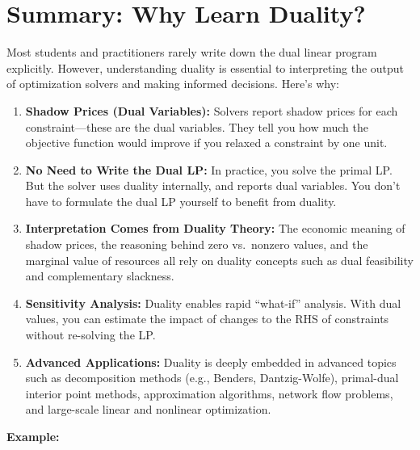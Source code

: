 \section{Summary: Why Learn Duality?}

\begin{tcolorbox}[colback=gray!5!white, colframe=black!75!white, title=\textbf{Duality in Practice: Why It Matters}]
Most students and practitioners rarely write down the dual linear program explicitly. 
However, understanding duality is essential to interpreting the output of optimization solvers 
and making informed decisions. Here's why:

\begin{enumerate}
    \item \textbf{Shadow Prices (Dual Variables):}  
    Solvers report shadow prices for each constraint—these are the dual variables. 
    They tell you how much the objective function would improve if you relaxed a constraint by one unit.
    
    \item \textbf{No Need to Write the Dual LP:}  
    In practice, you solve the primal LP. But the solver uses duality internally, and reports dual variables.
    You don't have to formulate the dual LP yourself to benefit from duality.
    
    \item \textbf{Interpretation Comes from Duality Theory:}  
    The economic meaning of shadow prices, the reasoning behind zero vs.\ nonzero values, and the marginal value of resources 
    all rely on duality concepts such as dual feasibility and complementary slackness.
    
    \item \textbf{Sensitivity Analysis:}  
    Duality enables rapid “what-if” analysis. With dual values, you can estimate the impact of changes to the RHS of constraints
    without re-solving the LP.

    \item \textbf{Advanced Applications:}  
    Duality is deeply embedded in advanced topics such as decomposition methods (e.g., Benders, Dantzig-Wolfe), primal-dual interior point methods, approximation algorithms, network flow problems, and large-scale linear and nonlinear optimization.
\end{enumerate}

\medskip

\noindent\textbf{Example:}


\end{tcolorbox}
